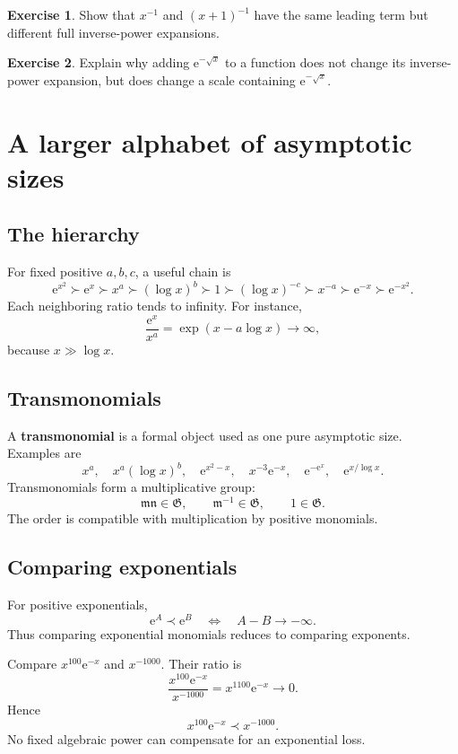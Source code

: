 \documentclass[11pt,oneside,openany]{book}
\newcommand{\G}{\mathfrak{G}}
\newcommand{\e}{\mathrm{e}}
\newcommand{\mon}{\mathfrak{m}}
\newcommand{\nmon}{\mathfrak{n}}
\theoremstyle{plain}
\theoremstyle{definition}
\newtheorem{exercise}{Exercise}[chapter]
\theoremstyle{remark}
\newcommand{\term}[1]{\textbf{#1}}
\begin{document}
\begin{exercise}
Show that $x^{-1}$ and $(x+1)^{-1}$ have the same leading term but different full inverse-power expansions.
\end{exercise}

\begin{exercise}
Explain why adding $\e^{-\sqrt{x}}$ to a function does not change its inverse-power expansion, but does change a scale containing $\e^{-\sqrt{x}}$.
\end{exercise}


\chapter{A larger alphabet of asymptotic sizes}
\label{ch:alphabet}

\section{The hierarchy}
For fixed positive $a,b,c$, a useful chain is
\[
  \e^{x^2}\succ\e^x\succ x^a\succ(\log x)^b
  \succ1\succ(\log x)^{-c}\succ x^{-a}
  \succ\e^{-x}\succ\e^{-x^2}.
\]
Each neighboring ratio tends to infinity. For instance,
\[
  \frac{\e^x}{x^a}=\exp(x-a\log x)\to\infty,
\]
because $x\gg\log x$.

\section{Transmonomials}
A \term{transmonomial} is a formal object used as one pure asymptotic size. Examples are
\[
  x^a,
  \quad x^a(\log x)^b,
  \quad\e^{x^2-x},
  \quad x^{-3}\e^{-x},
  \quad\e^{-\e^x},
  \quad\e^{x/\log x}.
\]
Transmonomials form a multiplicative group:
\[
  \mon\nmon\in\G,
  \qquad\mon^{-1}\in\G,
  \qquad1\in\G.
\]
The order is compatible with multiplication by positive monomials.

\section{Comparing exponentials}
For positive exponentials,
\[
  \e^A\prec\e^B
  \quad\Longleftrightarrow\quad
  A-B\to-\infty.
\]
Thus comparing exponential monomials reduces to comparing exponents.

\begin{worked}
Compare $x^{100}\e^{-x}$ and $x^{-1000}$. Their ratio is
\[
  \frac{x^{100}\e^{-x}}{x^{-1000}}
  =x^{1100}\e^{-x}\to0.
\]
Hence
\[
  x^{100}\e^{-x}\prec x^{-1000}.
\]
No fixed algebraic power can compensate for an exponential loss.
\end{worked}
\end{document}
